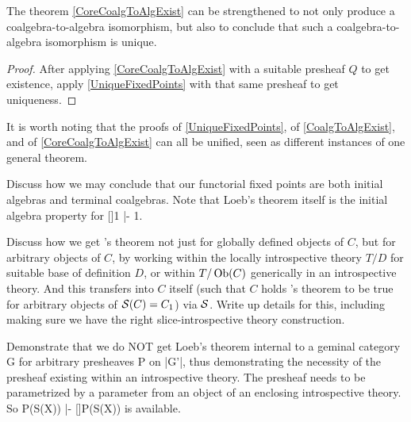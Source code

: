 \begin{theorem}
The theorem \cref{CoreCoalgToAlgExist} can be strengthened to not only produce a coalgebra-to-algebra isomorphism, but also to conclude that such a coalgebra-to-algebra isomorphism is unique.
\end{theorem}
\begin{proof}
After applying \cref{CoreCoalgToAlgExist} with a suitable presheaf $Q$ to get existence, apply \cref{UniqueFixedPoints} with that same presheaf to get uniqueness.
\end{proof}

It is worth noting that the proofs of \cref{UniqueFixedPoints}, of \cref{CoalgToAlgExist}, and of \cref{CoreCoalgToAlgExist} can all be unified, seen as different instances of one general theorem. 

\begin{TODOblock}
Discuss how we may conclude that our functorial fixed points are both initial algebras and terminal coalgebras. Note that Loeb's theorem itself is the initial algebra property for []1 |- 1.
\end{TODOblock}

\begin{TODOblock}
Discuss how we get \Loeb's theorem not just for globally defined objects of $C$, but for arbitrary objects of $C$, by working within the locally introspective theory $T/D$ for suitable base of definition $D$, or within $T/\operatorname{Ob}(C)$ generically in an introspective theory. And this transfers into $C$ itself (such that $C$ holds \Loeb's theorem to be true for arbitrary objects of $\mathcal{S}(C) = C_1$) via $\mathcal{S}$. Write up details for this, including making sure we have the right slice-introspective theory construction.
\end{TODOblock}

\begin{TODOblock}
Demonstrate that we do NOT get Loeb's theorem internal to a geminal category G for arbitrary presheaves P on |G'|, thus demonstrating the necessity of the presheaf existing within an introspective theory. The presheaf needs to be parametrized by a parameter from an object of an enclosing introspective theory. So P(S(X)) |- []P(S(X)) is available.
\end{TODOblock}